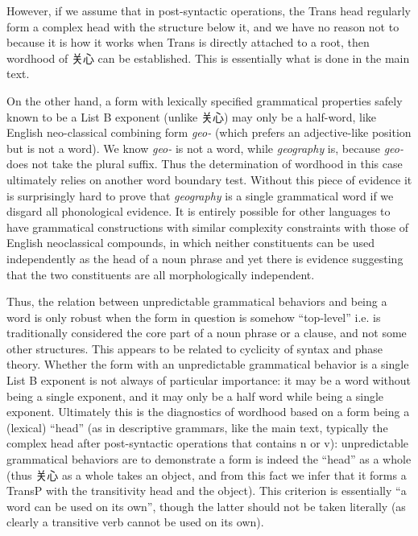 \documentclass[UTF8, a4paper, oneside, scheme=plain, 12pt]{ctexrep}
\newcommand{\form}[1]{\emph{#1}}
\begin{document}
{However, if we assume that in post-syntactic operations, the Trans head regularly form a complex head with the structure below it, and we have no reason not to because it is how it works when Trans is directly attached to a root, then wordhood of 关心 can be established. This is essentially what is done in the main text.

On the other hand, a form with lexically specified grammatical properties safely known to be a List B exponent (unlike 关心) may only be a half-word,
like English neo-classical combining form \form{geo-} (which prefers an adjective-like position but is not a word).
We know \form{geo-} is not a word, while \form{geography} is,
because \form{geo-} does not take the plural suffix.
Thus the determination of wordhood in this case ultimately relies on another word boundary test.
Without this piece of evidence it is surprisingly hard to prove that \form{geography} is a single grammatical word if we disgard all phonological evidence.
It is entirely possible for other languages to have grammatical constructions with similar complexity constraints with those of English neoclassical compounds, in which neither constituents can be used independently as the head of a noun phrase
and yet there is evidence suggesting that the two constituents are all morphologically independent.

Thus, the relation between unpredictable grammatical behaviors and being a word is only robust when the form in question is somehow ``top-level'' i.e. is traditionally considered the core part of a noun phrase or a clause, and not some other structures.
This appears to be related to cyclicity of syntax and phase theory.
Whether the form with an unpredictable grammatical behavior is a single List B exponent is not always of particular importance:
it may be a word without being a single exponent, 
and it may only be a half word while being a single exponent.
Ultimately this is the diagnostics of wordhood based on a form being a (lexical) ``head''
(as in descriptive grammars, like the main text, typically the complex head after post-syntactic operations that contains n or v):
unpredictable grammatical behaviors are to demonstrate a form is indeed the ``head'' as a whole
(thus 关心 as a whole takes an object, and from this fact we infer that it forms a TransP with the transitivity head and the object).
This criterion is essentially ``a word can be used on its own'', though the latter should not be taken literally (as clearly a transitive verb cannot be used on its own).

}
\end{document}
